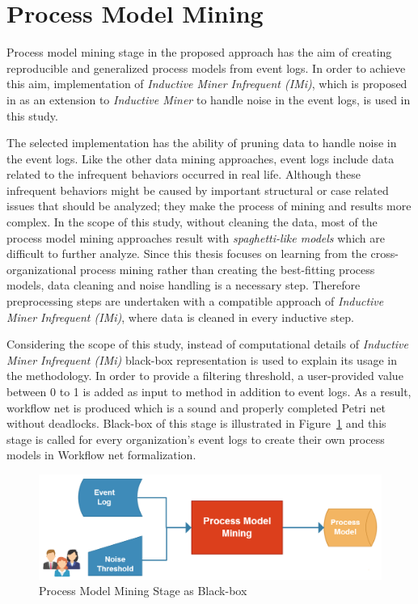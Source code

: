 \section{Process Model Mining}
\label{sec:process-model-mining}
Process model mining stage in the proposed approach has the aim of creating reproducible and generalized process models from event logs. In order to achieve this aim, implementation of \textit{Inductive Miner Infrequent (IMi)}, which is proposed in \cite{leemans2014discoveringinfrequent} as an extension to \textit{Inductive Miner} to handle noise in the event logs, is used in this study. 

The selected implementation has the ability of pruning data to handle noise in the event logs. Like the other data mining approaches, event logs include data related to the infrequent behaviors occurred in real life. Although these infrequent behaviors might be caused by important structural or case related issues that should be analyzed; they make the process of mining and results more complex. In the scope of this study, without cleaning the data, most of the process model mining approaches result with \textit{spaghetti-like models} \cite{van2011process} which are difficult to further analyze. Since this thesis focuses on learning from the cross-organizational process mining rather than creating the best-fitting process models, data cleaning and noise handling is a necessary step. Therefore preprocessing steps are undertaken with a compatible approach of \textit{Inductive Miner Infrequent (IMi)}, where data is cleaned in every inductive step.

Considering the scope of this study, instead of computational details of \textit{Inductive Miner Infrequent (IMi)} black-box representation is used to explain its usage in the methodology. In order to provide a filtering threshold, a user-provided value between 0 to 1 is added as input to method in addition to event logs. As a result, workflow net is produced which is a sound and properly completed Petri net without deadlocks. Black-box of this stage is illustrated in Figure~\ref{fig:process-model-mining-blackbox} and this stage is called for every organization's event logs to create their own process models in Workflow net formalization.

\begin{figure}
  \centering
  \includegraphics[width=\textwidth]{4_methodology/process-model-mining-blackbox}
  \caption{Process Model Mining Stage as Black-box }
  \label{fig:process-model-mining-blackbox}
\end{figure}


